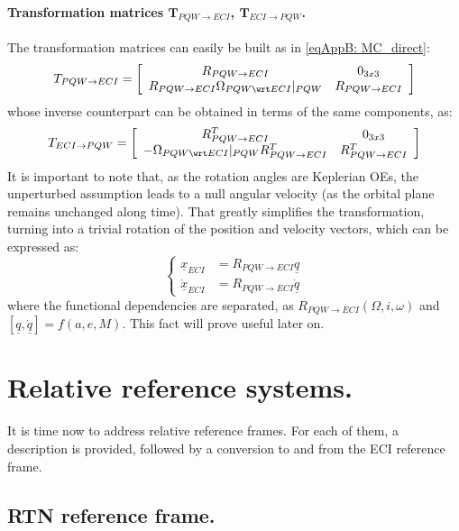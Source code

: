 			\paragraph{Transformation matrices $\bm T_{PQW\rightarrow ECI}$, $\bm T_{ECI\rightarrow PQW}$. \\}
			\indent The transformation matrices can easily be built as in \eqref{eqAppB: 	MC_direct}:
			\[
			 T_{PQW\to ECI} = \left[\begin{array}{cc}
	R_{PQW\to ECI} & 0_{3x3} \\
	R_{PQW\to ECI} \Omega_{PQW \wrt ECI}\rvert_{PQW} & R_{PQW\to ECI}
	\end{array}\right]
			\]
			\noindent whose inverse counterpart can be obtained in terms of the same components, as:
			\[
			 T_{ECI\to PQW} = \left[\begin{array}{cc}
	R_{PQW\to ECI}^T & 0_{3x3} \\
	-\Omega_{PQW \wrt ECI}\rvert_{PQW} R_{PQW\to ECI}^T & R_{PQW\to ECI}^T
	\end{array}\right]
			\]
			\indent It is important to note that, as the rotation angles are Keplerian OEs, the unperturbed assumption leads to a null angular velocity (as the orbital plane remains unchanged along time). That greatly simplifies the transformation, turning into a trivial rotation of the position and velocity vectors, which can be expressed as:
			\begin{equation}
			\left\{\begin{array}{lll}
			\underline{x}_{ECI} & = R_{PQW\to ECI} \underline{q} \\
			\underline{\dot{x}}_{ECI} & = R_{PQW\to ECI} \underline{\dot{q}} 
			\end{array}\right.
			\label{eqAppB:PQW2ECI}
			\end{equation}
			\noindent where the functional dependencies are separated, as $R_{PQW\to ECI}(\Omega, i, \omega)$ and $[\underline{q}, \underline{\dot{q}}] = f(a, e, M)$. This fact will prove useful later on.
\section{Relative reference systems.}
%
\indent It is time now to address relative reference frames. For each of them, a description is provided, followed by a conversion to and from the ECI reference frame. 
%
	\subsection{RTN reference frame.} \label{sec: RTN}
